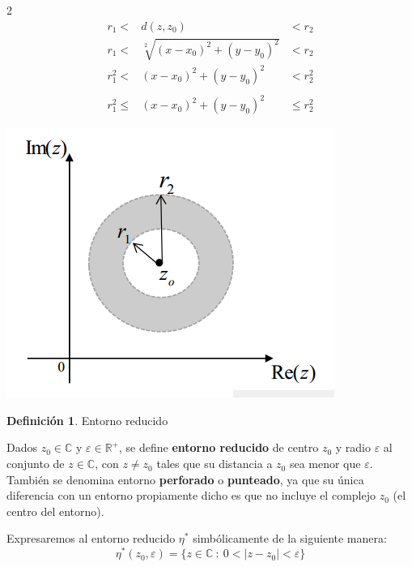 \documentclass[12pt]{article}
\theoremstyle{definition}
\newtheorem{definition}{Definici\'on}[section]
\begin{document}
\begin{multicols} {2}
\begin{eqnarray*}
r_1 < &d(z, z_0)& < r_2\\
r_1 < &\sqrt[2]{(x-x_0)^2 + (y-y_0)^2}& < r_2\\
r_1^2 < &(x-x_0)^2 + (y-y_0)^2& < r_2^2\\
\\
r_1^2 \leq &(x-x_0)^2 + (y-y_0)^2& \leq r_2^2
\end{eqnarray*}
\linebreak

\begin{center}
	\includegraphics[scale=0.7]{corona.png}
\end{center}
\end{multicols}

\colorbox{red!40!white!80}{\parbox{\linewidth}{
\theoremstyle{definition}
\begin{definition} Entorno reducido

Dados $z_0 \in \mathbb{C}$ y $\varepsilon \in \mathbb{R}^+$, se define \textbf{entorno reducido} de centro $z_0$ y radio $\varepsilon$ al conjunto de $z \in \mathbb{C}$, con $z \neq z_0$ tales que su distancia a $z_0$ sea menor que $\varepsilon$. Tambi\'en se denomina entorno \textbf{perforado} o \textbf{punteado}, ya que su \'unica diferencia con un entorno propiamente dicho es que no incluye el complejo $z_0$ (el centro del entorno).

Expresaremos al entorno reducido $\eta^*$ simb\'olicamente de la siguiente manera:
$$ \eta^*(z_0, \varepsilon) = \{ z \in \mathbb{C}\ :\ 0<|z-z_0|<\varepsilon\} $$
\end{definition}}}
\end{document}
